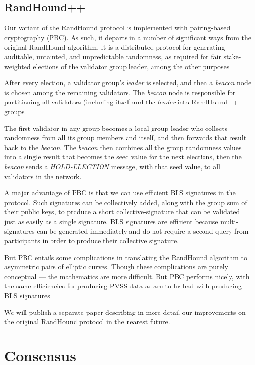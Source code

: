 \documentclass[a4paper, 10pt, conference]{ieeeconf}
\begin{document}
\subsection{RandHound++}

Our variant of the RandHound protocol is implemented with pairing-based cryptography (PBC). As such, it departs in a number of significant ways from the original RandHound algorithm. It is a distributed protocol for generating audit\-able, untainted, and unpredictable randomness, as required for fair stake-weighted elections of the validator group leader, among the other purposes.

After every election, a validator group's \textit{leader} is selected, and then a \textit{beacon} node is chosen among the remaining validators. The \textit{beacon} node is responsible for partitioning all validators (including itself and the \textit{leader} into RandHound++ groups. 

The first validator in any group becomes a local group leader who collects randomness from all its group members and itself, and then forwards that result back to the \textit{beacon}. The \textit{beacon} then combines all the group randomness values into a single result that becomes the seed value for the next elections, then the \textit{beacon} sends a \textit{HOLD-ELECTION} message, with that seed value, to all validators in the network.

A major advantage of PBC is that we can use efficient BLS signatures\cite{c16} in the protocol. Such signatures can be collectively added, along with the group sum of their public keys, to produce a short collective-signature that can be validated just as easily as a single signature. BLS signatures are efficient because multi-signatures can be generated immediately and do not require a second query from participants in order to produce their collective signature.

But PBC entails some complications in translating the RandHound algorithm to asymmetric pairs of elliptic curves. Though these complications are purely conceptual --- the mathematics are more difficult. But PBC performs nicely, with the same efficiencies for producing PVSS data as are to be had with producing BLS signatures.

We will publish a separate paper describing in more detail our improvements on the original RandHound protocol in the nearest future.

\section{Consensus}\label{consensus}
\end{document}
